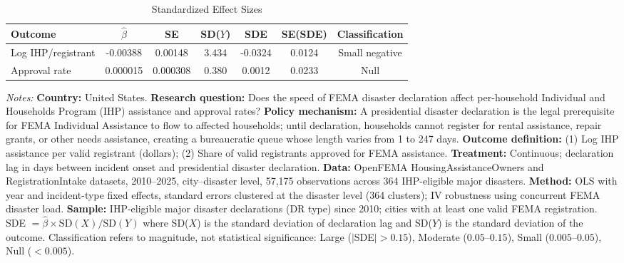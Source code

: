 \begin{table}[t]
\centering
\caption{Standardized Effect Sizes}
\label{tab:sde}
\begin{tabular}{lcccccc}
\toprule
Outcome & $\hat{\beta}$ & SE & SD($Y$) & SDE & SE(SDE) & Classification \\
\midrule
Log IHP/registrant & -0.00388 & 0.00148 & 3.434 & -0.0324 & 0.0124 & Small negative \\
Approval rate & 0.000015 & 0.000308 & 0.380 & 0.0012 & 0.0233 & Null \\
\bottomrule
\end{tabular}
\begin{tablenotes}[flushleft]
\small
\item \textit{Notes:} \textbf{Country:} United States. \textbf{Research question:} Does the speed of FEMA disaster declaration affect per-household Individual and Households Program (IHP) assistance and approval rates? \textbf{Policy mechanism:} A presidential disaster declaration is the legal prerequisite for FEMA Individual Assistance to flow to affected households; until declaration, households cannot register for rental assistance, repair grants, or other needs assistance, creating a bureaucratic queue whose length varies from 1 to 247 days. \textbf{Outcome definition:} (1) Log IHP assistance per valid registrant (dollars); (2) Share of valid registrants approved for FEMA assistance. \textbf{Treatment:} Continuous; declaration lag in days between incident onset and presidential disaster declaration. \textbf{Data:} OpenFEMA HousingAssistanceOwners and RegistrationIntake datasets, 2010--2025, city--disaster level, 57,175 observations across 364 IHP-eligible major disasters. \textbf{Method:} OLS with year and incident-type fixed effects, standard errors clustered at the disaster level (364 clusters); IV robustness using concurrent FEMA disaster load. \textbf{Sample:} IHP-eligible major disaster declarations (DR type) since 2010; cities with at least one valid FEMA registration. SDE $= \hat{\beta} \times \text{SD}(X) / \text{SD}(Y)$ where SD($X$) is the standard deviation of declaration lag and SD($Y$) is the standard deviation of the outcome. Classification refers to magnitude, not statistical significance: Large ($|$SDE$| > 0.15$), Moderate ($0.05$--$0.15$), Small ($0.005$--$0.05$), Null ($< 0.005$).
\end{tablenotes}
\end{table}
